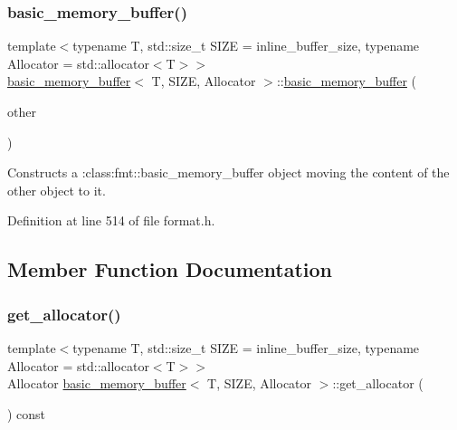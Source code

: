 \mbox{\label{classbasic__memory__buffer_a981f02b3da4bdd36d32c065369c66f7d}} 
\subsubsection{\texorpdfstring{basic\+\_\+memory\+\_\+buffer()}{basic\_memory\_buffer()}\hspace{0.1cm}{\footnotesize\ttfamily [2/2]}}
{\footnotesize\ttfamily template$<$typename T, std\+::size\+\_\+t S\+I\+ZE = inline\+\_\+buffer\+\_\+size, typename Allocator = std\+::allocator$<$\+T$>$$>$ \\
\hyperlink{classbasic__memory__buffer}{basic\+\_\+memory\+\_\+buffer}$<$ T, S\+I\+ZE, Allocator $>$\+::\hyperlink{classbasic__memory__buffer}{basic\+\_\+memory\+\_\+buffer} (\begin{DoxyParamCaption}\item[{\hyperlink{classbasic__memory__buffer}{basic\+\_\+memory\+\_\+buffer}$<$ T, S\+I\+ZE, Allocator $>$ \&\&}]{other }\end{DoxyParamCaption})\hspace{0.3cm}{\ttfamily [inline]}}

Constructs a \+:class\+:{\ttfamily fmt\+::basic\+\_\+memory\+\_\+buffer} object moving the content of the other object to it.  

Definition at line 514 of file format.\+h.



\subsection{Member Function Documentation}
\mbox{\label{classbasic__memory__buffer_aad7b7f524c4c1301f5a88e54cc68e352}} 
\subsubsection{\texorpdfstring{get\+\_\+allocator()}{get\_allocator()}}
{\footnotesize\ttfamily template$<$typename T, std\+::size\+\_\+t S\+I\+ZE = inline\+\_\+buffer\+\_\+size, typename Allocator = std\+::allocator$<$\+T$>$$>$ \\
Allocator \hyperlink{classbasic__memory__buffer}{basic\+\_\+memory\+\_\+buffer}$<$ T, S\+I\+ZE, Allocator $>$\+::get\+\_\+allocator (\begin{DoxyParamCaption}{ }\end{DoxyParamCaption}) const\hspace{0.3cm}{\ttfamily [inline]}}



